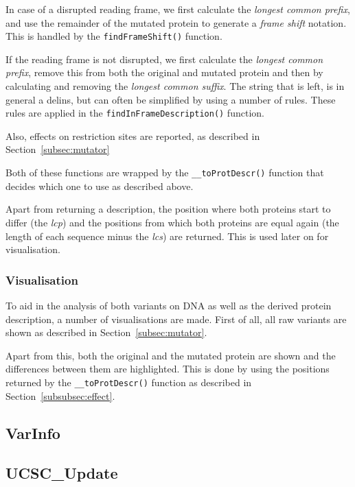 \documentclass{article}
\begin{document}
In case of a disrupted reading frame, we first calculate the \emph{longest
common prefix}, and use the remainder of the mutated protein to generate
a \emph{frame shift} notation. This is handled by the \texttt{findFrameShift()}
function.

If the reading frame is not disrupted, we first calculate the \emph{longest
common prefix}, remove this from both the original and mutated protein and then
by calculating and removing the \emph{longest common suffix}. The string that
is left, is in general a delins, but can often be simplified by using a number
of rules. These rules are applied in the \texttt{findInFrameDescription()} 
function.

Also, effects on restriction sites are reported, as described in 
Section~\ref{subsec:mutator}

Both of these functions are wrapped by the \texttt{\_\_toProtDescr()} function
that decides which one to use as described above.

Apart from returning a description, the position where both proteins start
to differ (the \emph{lcp}) and the positions from which both proteins are equal
again (the length of each sequence minus the \emph{lcs}) are returned. This is
used later on for visualisation.

\subsubsection{Visualisation} \label{subsubsec:visualisation}
To aid in the analysis of both variants on DNA as well as the derived protein
description, a number of visualisations are made. First of all, all raw
variants are shown as described in Section~\ref{subsec:mutator}. 

Apart from this, both the original and the mutated protein are shown and the
differences between them are highlighted. This is done by using the positions
returned by the \texttt{\_\_toProtDescr()} function as described in 
Section~\ref{subsubsec:effect}.

\subsection{VarInfo} \label{subsec:varinfo}


\subsection{UCSC\_Update} \label{subsec:ucsc_update}
\end{document}
